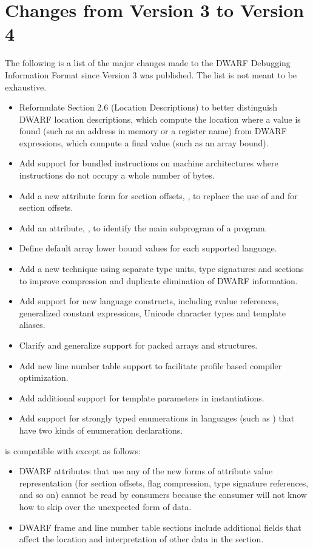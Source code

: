\section{Changes from Version 3 to Version 4}
The following is a list of the major changes made to the 
DWARF Debugging Information Format since Version 3 was 
published. The list is not meant to be exhaustive.
\begin{itemize}
\item Reformulate 
Section 2.6 (Location Descriptions) 
to better distinguish DWARF location descriptions, which
compute the location where a value is found (such as an 
address in memory or a register name) from DWARF expressions, 
which compute a final value (such as an array bound).
\item Add support for bundled instructions on machine architectures 
where instructions do not occupy a whole number of bytes.
\item Add a new attribute form for section offsets, 
\DWFORMsecoffsetNAME,
to replace the use of 
\DWFORMdatafourNAME{} and \DWFORMdataeightNAME{} for section offsets.
\item Add an attribute, \DWATmainsubprogramNAME, to identify the main subprogram of a
program.
\item Define default array lower bound values for each supported language.
\item Add a new technique using separate type units, type signatures and \COMDAT{} sections to
improve compression and duplicate elimination of DWARF information.
\item Add support for new  language constructs, including rvalue references, generalized
constant expressions, Unicode character types and template aliases.
\item Clarify and generalize support for packed arrays and structures.
\item Add new line number table support to facilitate profile based compiler optimization.
\item Add additional support for template parameters in instantiations.
\item Add support for strongly typed enumerations in languages (such as ) that have two
kinds of enumeration declarations.
\end{itemize}
 is compatible with 
 except as follows:
\begin{itemize}
\item DWARF attributes that use any of the new forms of attribute value representation (for
section offsets, flag compression, type signature references, and so on) cannot be read by
consumers because the consumer will not know how to skip over the
unexpected form of data.
\item DWARF frame and line number table sections include additional fields that affect the location
and interpretation of other data in the section.
\end{itemize}

